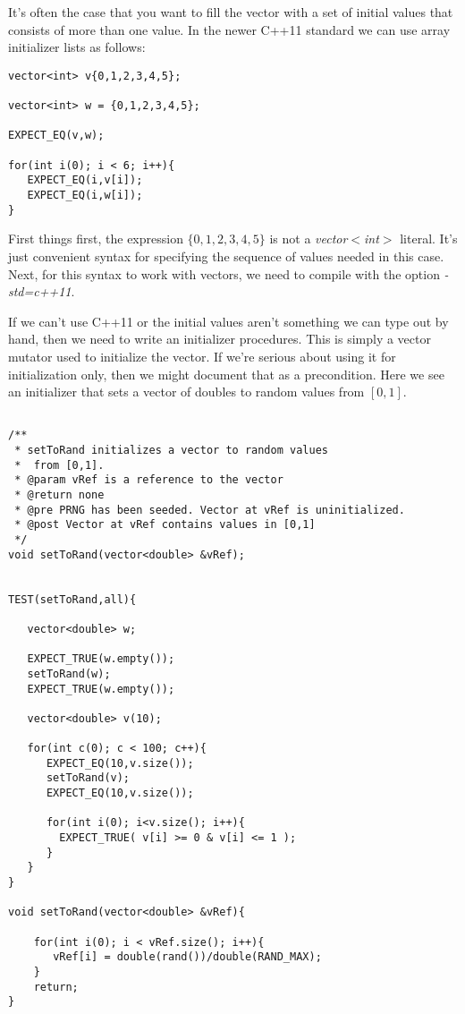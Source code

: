 \documentclass[]{tufte-handout}
\begin{document}
It's often the case that you want to fill the vector with a set of initial values that consists of more than one value. In the newer C++11 standard we can use array initializer lists as follows:
\begin{verbatim}
vector<int> v{0,1,2,3,4,5};

vector<int> w = {0,1,2,3,4,5};

EXPECT_EQ(v,w);

for(int i(0); i < 6; i++){
   EXPECT_EQ(i,v[i]);
   EXPECT_EQ(i,w[i]);   
}

\end{verbatim}

First things first, the expression $\{0,1,2,3,4,5\}$ is not a \textit{vector$<$int$>$} literal. It's just convenient syntax for specifying the sequence of values needed in this case. Next, for this syntax to work with vectors, we need to compile with the option \textit{-std=c++11}.

If we can't use C++11 or the initial values aren't something we can type out by hand, then we need to write an initializer procedures. This is simply a vector mutator used to initialize the vector.  If we're serious about using it for initialization only, then we might document that as a precondition.  Here we see an initializer that sets a vector of doubles to random values from $[0,1]$.
\begin{verbatim}

/**
 * setToRand initializes a vector to random values
 *  from [0,1].
 * @param vRef is a reference to the vector
 * @return none
 * @pre PRNG has been seeded. Vector at vRef is uninitialized.
 * @post Vector at vRef contains values in [0,1]
 */
void setToRand(vector<double> &vRef);


TEST(setToRand,all){

   vector<double> w;

   EXPECT_TRUE(w.empty());
   setToRand(w);
   EXPECT_TRUE(w.empty());

   vector<double> v(10);
   
   for(int c(0); c < 100; c++){
      EXPECT_EQ(10,v.size());
      setToRand(v);
      EXPECT_EQ(10,v.size());

      for(int i(0); i<v.size(); i++){
        EXPECT_TRUE( v[i] >= 0 & v[i] <= 1 );
      }
   }
}

void setToRand(vector<double> &vRef){

	for(int i(0); i < vRef.size(); i++){
	   vRef[i] = double(rand())/double(RAND_MAX);	
	}
	return;
}

\end{verbatim}
\end{document}
